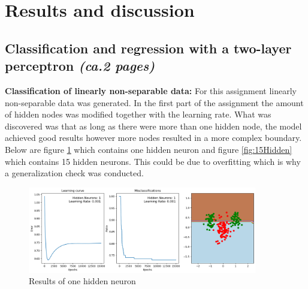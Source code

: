 \documentclass[a4paper]{article}
\begin{document}
\section{Results and discussion}
\subsection{Classification and regression with a two-layer perceptron \textit{(ca.2 pages)}}
\textbf{Classification of linearly non-separable data:} For this assignment linearly non-separable data was generated. In the first part of the assignment the amount of hidden nodes was modified together with the learning rate. What was discovered was that as long as there were more than one hidden node, the model achieved good results however more nodes resulted in a more complex boundary. Below are figure \ref{fig:1Hidden} which contains one hidden neuron and figure \ref{fig:15Hidden} which contains 15 hidden neurons. This could be due to overfitting which is why a generalization check was conducted.

\begin{figure}[htb]
    \centering
    \includegraphics[width=10cm]{Labs/Lab 1/Lab 1b/Figure/1Hiddenlayer.png}
    \caption{Results of one hidden neuron}
    \label{fig:1Hidden}
\end{figure}
\end{document}
